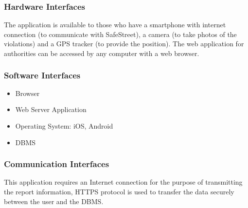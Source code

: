 \subsubsection{Hardware Interfaces}

The application is available to those who have a smartphone with internet connection (to communicate with SafeStreet), a camera (to take photos of the violations) and a GPS tracker (to provide the position).
The web application for authorities can be accessed by any computer with a web browser.

\subsubsection{Software Interfaces}

\begin{itemize}

\item Browser
\item Web Server Application
\item Operating System: iOS, Android
\item DBMS

\end{itemize} 

\subsubsection{Communication Interfaces}

This application requires an Internet connection for the purpose of transmitting the report information, HTTPS protocol is used to transfer the data securely between the user and the DBMS.

